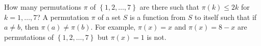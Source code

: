 How many permutations $\pi$ of $\left\{1,2,\ldots,7\right\}$ are there such that $\pi\left(k\right)\leq2k$ for $k=1,\ldots,7$? A permutation $\pi$ of a set $S$ is a function from $S$ to itself such that if $a\neq b$, then $\pi\left(a\right)\neq\pi\left(b\right)$. For example, $\pi\left(x\right)=x$ and $\pi\left(x\right)=8-x$ are permutations of $\left\{1,2,\ldots,7\right\}$ but $\pi\left(x\right)=1$ is not.